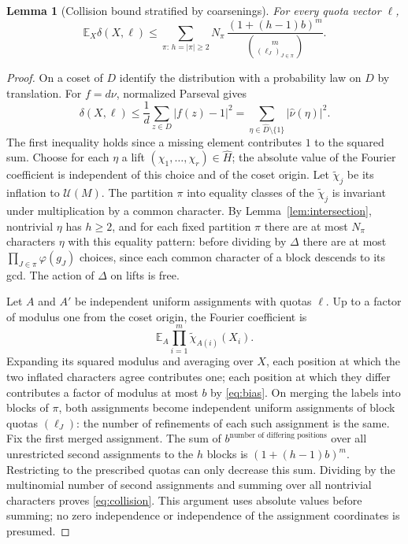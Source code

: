 \documentclass[11pt]{article}
\newtheorem{lemma}[theorem]{Lemma}
\theoremstyle{definition}\newtheorem{remark}[theorem]{Remark}
\newcommand{\G}{\mathcal U}
\newcommand{\E}{\mathbb E}
\begin{document}
\begin{lemma}[Collision bound stratified by coarsenings]\label{lem:collision}
For every quota vector $\ell$,
\begin{equation}\label{eq:collision}
 \E_X\delta(X,\ell)\le\sum_{\pi:\,h=|\pi|\ge2} N_\pi\,
 \frac{(1+(h-1)b)^m}{\binom{m}{(\ell_J)_{J\in\pi}}} .
\end{equation}
\end{lemma}
\begin{proof}
On a coset of $D$ identify the distribution with a probability law on $D$ by translation. For $f=d\nu$, normalized Parseval gives
\[
 \delta(X,\ell)\le\frac1d\sum_{z\in D}|f(z)-1|^2
 =\sum_{\eta\in\widehat D\setminus\{1\}}|\widehat\nu(\eta)|^2 .
\]
The first inequality holds since a missing element contributes $1$ to the squared sum. Choose for each $\eta$ a lift $(\chi_1,\dots,\chi_r)\in\widehat H$; the absolute value of the Fourier coefficient is independent of this choice and of the coset origin. Let $\widetilde\chi_j$ be its inflation to $\G(M)$. The partition $\pi$ into equality classes of the $\widetilde\chi_j$ is invariant under multiplication by a common character. By Lemma~\ref{lem:intersection}, nontrivial $\eta$ has $h\ge2$, and for each fixed partition $\pi$ there are at most $N_\pi$ characters $\eta$ with this equality pattern: before dividing by $\Delta$ there are at most $\prod_{J\in\pi}\varphi(g_J)$ choices, since each common character of a block descends to its gcd. The action of $\Delta$ on lifts is free.

Let $A$ and $A'$ be independent uniform assignments with quotas $\ell$. Up to a factor of modulus one from the coset origin, the Fourier coefficient is
\[
 \E_A\prod_{i=1}^m\widetilde\chi_{A(i)}(X_i).
\]
Expanding its squared modulus and averaging over $X$, each position at which the two inflated characters agree contributes one; each position at which they differ contributes a factor of modulus at most $b$ by \eqref{eq:bias}. On merging the labels into blocks of $\pi$, both assignments become independent uniform assignments of block quotas $(\ell_J)$: the number of refinements of each such assignment is the same. Fix the first merged assignment. The sum of $b^{\text{number of differing positions}}$ over all unrestricted second assignments to the $h$ blocks is $(1+(h-1)b)^m$. Restricting to the prescribed quotas can only decrease this sum. Dividing by the multinomial number of second assignments and summing over all nontrivial characters proves \eqref{eq:collision}. This argument uses absolute values before summing; no zero independence or independence of the assignment coordinates is presumed.
\end{proof}
\end{document}
